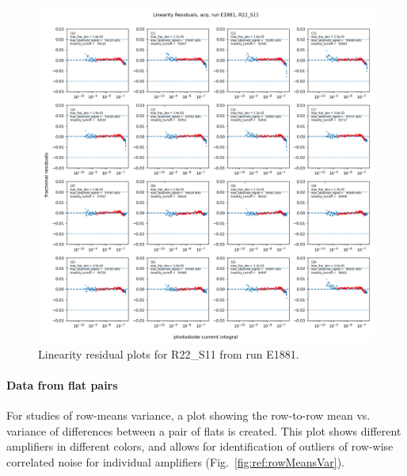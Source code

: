 \begin{figure}
    \centering
    \includegraphics[width=0.8\linewidth]{figures/ReferenceFigures/linearity_residuals_plot_LSSTCam_R22_S11_u_lsstccs_eo_linearity_plots_E1881_w_2024_35_20241105T131453Z.png}
    \caption{Linearity residual plots for R22\_S11 from run E1881.}
    \label{fig:ref:linearityResids}
\end{figure}

\clearpage
\paragraph{Data from flat pairs}

For studies of row-means variance, a plot showing the row-to-row mean vs. variance of differences between a pair of flats is created. This plot shows different amplifiers in different colors, and allows for identification of outliers of row-wise correlated noise for individual amplifiers (Fig.~\ref{fig:ref:rowMeansVar}).


